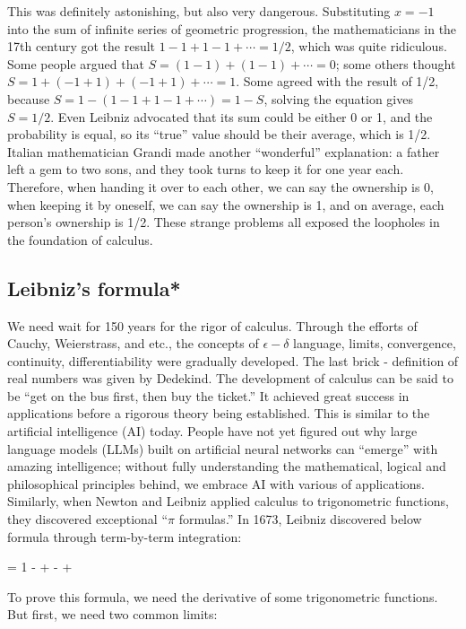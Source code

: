 \documentclass[b5paper]{article}
\begin{document}
This was definitely astonishing, but also very dangerous. Substituting $x = -1$ into the sum of infinite series of geometric progression, the mathematicians in the 17th century got the result $1 - 1 + 1 - 1 + \dotsb = 1/2$, which was quite ridiculous. Some people argued that $S = (1 - 1) + (1 - 1) + \dotsb = 0$; some others thought $S = 1 + (-1 + 1) + (-1 + 1) + \dotsb = 1$. Some agreed with the result of 1/2, because $S = 1 - (1 - 1 + 1 - 1 + \dotsb) = 1 - S$, solving the equation gives $S = 1/2$. Even Leibniz advocated that its sum could be either 0 or 1, and the probability is equal, so its \enquote{true} value should be their average, which is 1/2. Italian mathematician Grandi made another \enquote{wonderful} explanation: a father left a gem to two sons, and they took turns to keep it for one year each. Therefore, when handing it over to each other, we can say the ownership is 0, when keeping it by oneself, we can say the ownership is 1, and on average, each person's ownership is 1/2\cite{HanXueTao16}. These strange problems all exposed the loopholes in the foundation of calculus.

\subsection{Leibniz's formula*}
We need wait for 150 years for the rigor of calculus. Through the efforts of Cauchy, Weierstrass, and etc., the concepts of $\epsilon-\delta$ language, limits, convergence, continuity, differentiability were gradually developed. The last brick - definition of real numbers was given by Dedekind. The development of calculus can be said to be \enquote{get on the bus first, then buy the ticket.} It achieved great success in applications before a rigorous theory being established. This is similar to the artificial intelligence (AI) today. People have not yet figured out why large language models (LLMs) built on artificial neural networks can \enquote{emerge} with amazing intelligence; without fully understanding the mathematical, logical and philosophical principles behind, we embrace AI with various of applications. Similarly, when Newton and Leibniz applied calculus to trigonometric functions, they discovered exceptional \enquote{$\pi$ formulas.} In 1673, Leibniz discovered below formula through term-by-term integration:

\be
{} = 1 -  +  -  + \dotsb
\ee

To prove this formula, we need the derivative of some trigonometric functions. But first, we need two common limits:
\end{document}
